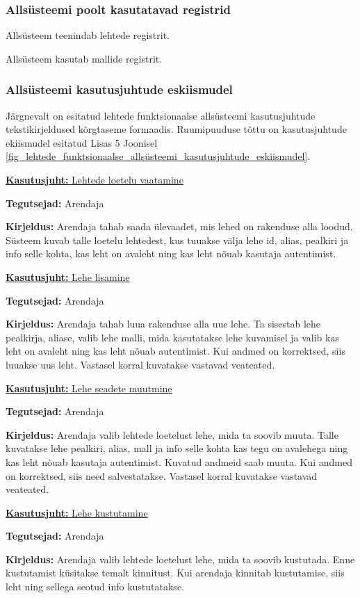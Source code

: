 \documentclass[a4paper,12pt]{article} %
\begin{document}
\subsubsection{Allsüsteemi poolt kasutatavad registrid}
Allsüsteem teenindab lehtede registrit.\par
Allsüsteem kasutab mallide registrit.
\subsubsection{Allsüsteemi kasutusjuhtude eskiismudel}
Järgnevalt on esitatud lehtede funktsionaalse allsüsteemi kasutusjuhtude tekstikirjeldused kõrgtaseme formaadis. Ruumipuuduse tõttu on kasutusjuhtude ekiismudel esitatud Lisas 5 Joonisel \ref{fig_lehtede_funktsionaalse_allsüsteemi_kasutusjuhtude_eskiismudel}.

\underline{\textbf{Kasutusjuht:} Lehtede loetelu vaatamine}
\par
\textbf{Tegutsejad:} Arendaja
\par
\textbf{Kirjeldus:} Arendaja tahab saada ülevaadet, mis lehed on rakenduse alla loodud. Süsteem kuvab talle loetelu lehtedest, kus tuuakse välja lehe id, alias, pealkiri ja info selle kohta, kas leht on avaleht ning kas leht nõuab kasutaja autentimist.
\par

\underline{\textbf{Kasutusjuht:} Lehe lisamine}
\par
\textbf{Tegutsejad:} Arendaja
\par
\textbf{Kirjeldus:} Arendaja tahab luua rakenduse alla uue lehe. Ta sisestab lehe pealkirja, aliase, valib lehe malli, mida kasutatakse lehe kuvamisel ja valib kas leht on avaleht ning kas leht nõuab autentimist. Kui andmed on korrektsed, siis luuakse uus leht. Vastasel korral kuvatakse vastavad veateated.
\par

\underline{\textbf{Kasutusjuht:} Lehe seadete muutmine}
\par
\textbf{Tegutsejad:} Arendaja
\par
\textbf{Kirjeldus:} Arendaja valib lehtede loetelust lehe, mida ta soovib muuta. Talle kuvatakse lehe pealkiri, alias, mall ja info selle kohta kas tegu on avalehega ning kas leht nõuab kasutaja autentimist. Kuvatud andmeid saab muuta. Kui andmed on korrektsed, siis need salvestatakse. Vastasel korral kuvatakse vastavad veateated.
\par

\underline{\textbf{Kasutusjuht:} Lehe kustutamine}
\par
\textbf{Tegutsejad:} Arendaja
\par
\textbf{Kirjeldus:} Arendaja valib lehtede loetelust lehe, mida ta soovib kustutada. Enne kustutamist küsitakse temalt kinnitust. Kui arendaja kinnitab kustutamise, siis leht ning sellega seotud info kustutatakse.
\par
\end{document}
